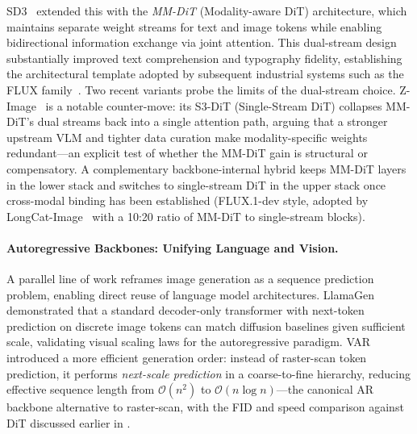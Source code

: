 SD3~\citep{esser2024stablediffusion3} extended this with the \emph{MM-DiT} (Modality-aware DiT) architecture, which maintains separate weight streams for text and image tokens while enabling bidirectional information exchange via joint attention. This dual-stream design substantially improved text comprehension and typography fidelity, establishing the architectural template adopted by subsequent industrial systems such as the FLUX family~\citep{labs2025flux1kontextflowmatching}. Two recent variants probe the limits of the dual-stream choice. Z-Image~\citep{cai2025z} is a notable counter-move: its S3-DiT (Single-Stream DiT) collapses MM-DiT's dual streams back into a single attention path, arguing that a stronger upstream VLM and tighter data curation make modality-specific weights redundant---an explicit test of whether the MM-DiT gain is structural or compensatory. A complementary backbone-internal hybrid keeps MM-DiT layers in the lower stack and switches to single-stream DiT in the upper stack once cross-modal binding has been established (FLUX.1-dev style, adopted by LongCat-Image~\citep{team2025longcat} with a 10:20 ratio of MM-DiT to single-stream blocks).

\paragraph{Autoregressive Backbones: Unifying Language and Vision.}
A parallel line of work reframes image generation as a sequence prediction problem, enabling direct reuse of language model architectures. LlamaGen~\citep{sun2024autoregressive} demonstrated that a standard decoder-only transformer with next-token prediction on discrete image tokens can match diffusion baselines given sufficient scale, validating visual scaling laws for the autoregressive paradigm. VAR~\citep{tian2024visual} introduced a more efficient generation order: instead of raster-scan token prediction, it performs \emph{next-scale prediction} in a coarse-to-fine hierarchy, reducing effective sequence length from $\mathcal{O}(n^2)$ to $\mathcal{O}(n\log n)$---the canonical AR backbone alternative to raster-scan, with the FID and speed comparison against DiT discussed earlier in .

